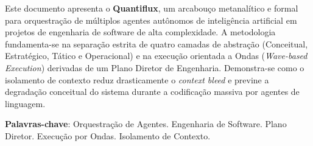 \documentclass[
	12pt,
	openright,
	oneside,
	a4paper,
	english,
	french,
	spanish,
	brazil
]{abntex2}
\begin{document}
\frenchspacing

\imprimirfolhaderosto

\begin{resumo}
 Este documento apresenta o \textbf{Quantiflux}, um arcabouço metanalítico e formal para orquestração de múltiplos agentes autônomos de inteligência artificial em projetos de engenharia de software de alta complexidade. A metodologia fundamenta-se na separação estrita de quatro camadas de abstração (Conceitual, Estratégico, Tático e Operacional) e na execução orientada a Ondas (\emph{Wave-based Execution}) derivadas de um Plano Diretor de Engenharia. Demonstra-se como o isolamento de contexto reduz drasticamente o \emph{context bleed} e previne a degradação conceitual do sistema durante a codificação massiva por agentes de linguagem.
 
 \vspace{\onelineskip}
 \noindent
 \textbf{Palavras-chave}: Orquestração de Agentes. Engenharia de Software. Plano Diretor. Execução por Ondas. Isolamento de Contexto.
\end{resumo}

\tableofcontents*
\cleardoublepage





\end{document}
